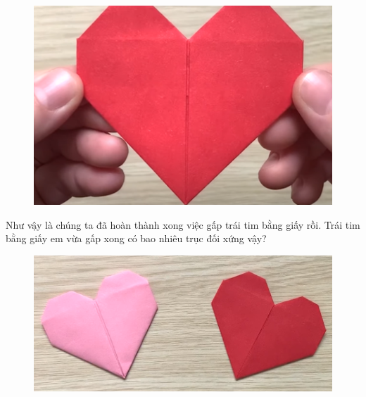 \begin{multicols}{2}
\begin{figure}[H]
		\vspace*{1pt}
		\includegraphics[width=1\linewidth]{43}
		\vspace*{-15pt}
	\end{figure}
	Như vậy là chúng ta đã hoàn thành xong việc gấp trái tim bằng giấy rồi. Trái tim bằng giấy em vừa gấp xong có bao nhiêu trục đối xứng vậy?
	\begin{figure}[H]
		\vspace*{-5pt}
		\centering
		\captionsetup{labelformat= empty, justification=centering}
		\includegraphics[width= 1\linewidth]{44}
		\vspace*{-15pt}
	\end{figure}
	
	
\end{multicols}

